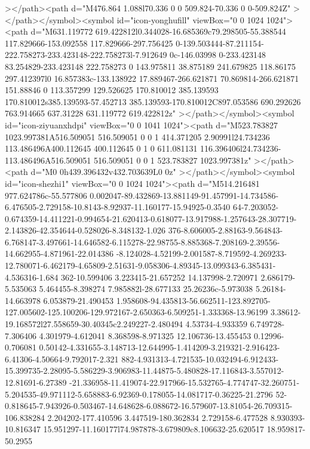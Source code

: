 {></path><path d="M476.864 1.088l70.336 0 0 509.824-70.336 0 0-509.824Z"  ></path></symbol><symbol id="icon-yonghufill" viewBox="0
0 1024 1024"><path d="M631.119772 619.422812l0.344028-16.685369c79.298505-55.388544 117.829666-153.092558 117.829666-297.756425
0-139.503444-87.211154-222.758273-233.423148-222.758273l-7.912649 0c-146.03998 0-233.423148 83.254829-233.423148 222.758273 0
143.975811 38.875189 241.679825 118.86175 297.412397l0 16.857383c-133.138922 17.889467-266.621871 70.869814-266.621871 151.88846
0 113.357299 129.526625 170.810012 385.139593 170.810012s385.139593-57.452713 385.139593-170.810012C897.053586 690.292626
763.914665 637.31228 631.119772 619.422812z"  ></path></symbol><symbol id="icon-ziyuanxhdpi" viewBox="0 0 1041 1024"><path
d="M523.783827 1023.997381A516.509051 516.509051 0 0 1 414.371205 2.90991l24.734236 113.486496A400.112645 400.112645 0 1 0
611.081131 116.396406l24.734236-113.486496A516.509051 516.509051 0 0 1 523.783827 1023.997381z"  ></path><path d="M0
0h439.396432v432.703639L0 0z"  ></path></symbol><symbol id="icon-shezhi1" viewBox="0 0 1024 1024"><path d="M514.216481
977.624786c-55.577806 0.002047-89.432869-13.881149-91.457991-14.734586-6.476505-2.729158-10.8143-8.92937-11.160177-15.94925-0.3540
64-7.203052-0.674359-14.411221-0.994654-21.620413-0.618077-13.917988-1.257643-28.307719-2.143826-42.354644-0.528026-8.348132-1.026
376-8.606005-2.88163-9.564843-6.768147-3.497661-14.646582-6.115278-22.98755-8.885368-7.208169-2.39556-14.662955-4.871961-22.014386
-8.124028-4.52199-2.001587-8.719592-4.269233-12.780071-6.462179-4.65809-2.51631-9.058306-4.89345-13.099343-6.385431-4.536316-1.684
362-10.599406 3.223415-21.657252 14.137998-2.720971 2.686179-5.535063 5.464455-8.398274 7.985882l-28.677133 25.26236c-5.973038
5.26184-14.663978 6.053879-21.490453
1.958608-94.435813-56.662511-123.892705-127.005602-125.100206-129.972167-2.650363-6.509251-1.333368-13.96199
3.38612-19.168572l27.558659-30.40345c2.249227-2.480494 4.53734-4.933359 6.749728-7.306406 4.301979-4.612041 8.368598-8.971325
12.106736-13.455453 0.12996-0.706081 0.50142-4.331655-3.148713-12.644995-1.414209-3.219321-2.916423-6.41306-4.50664-9.792017-2.321
882-4.931313-4.721535-10.032494-6.912433-15.399735-2.28095-5.586229-3.906983-11.44875-5.480828-17.116843-3.557012-12.81691-6.27389
-21.336958-11.419074-22.917966-15.532765-4.774747-32.260751-5.204535-49.971112-5.658883-6.92369-0.178055-14.081717-0.36225-21.2796
52-0.818645-7.943926-0.503467-14.648628-6.088672-16.579607-13.81054-26.709315-106.838284 2.204202-177.410596 3.447519-180.362834
2.729158-6.477528 8.930393-10.816347 15.951297-11.160177l74.987878-3.679809c8.106632-25.620517 18.959817-50.2955
}
